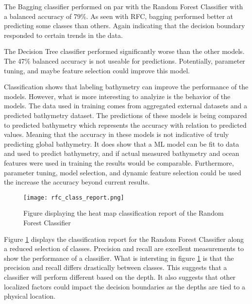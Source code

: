 \par
The Bagging classifier performed on par with the Random Forest Classifier with a balanced accuracy of 79\%.
As seen with \ac{RFC}, bagging performed better at predicting some classes than others.
Again indicating that the decision boundary responded to certain trends in the data.

\par
The Decision Tree classifier performed significantly worse than the other models.
The 47\% balanced accuracy is not useable for predictions.
Potentially, parameter tuning, and maybe feature selection could improve this model.

\par
Classification shows that labeling bathymetry can improve the performance of the models.
However, what is more interesting to analyize is the behavior of the models.
The data used in training comes from aggregated external datasets and a predicted bathymetry dataset.
The predictions of these models is being compared to predicted bathymetry which represents the accuracy with relation to predicted values.
Meaning that the accuracy in these models is not indicative of truly predicting global bathymetry.
It does show that a \ac{ML} model can be fit to data and used to predict bathymetry, and if actual measured bathymetry and ocean features were used in training the results would be comparable.
Furthermore, parameter tuning, model selection, and dynamic feature selection could be used the increase the accuracy beyond current results.

\begin{figure}[hb]
    \centering
    \texttt{[image: rfc\_class\_report.png]}
    \caption{Figure displaying the heat map classification report of the Random Forest Classifier}
    \label{fig:rfc_report}
\end{figure}

\par
Figure \ref{fig:rfc_report} displays the classification report for the Random Forest Classifier along a reduced selection of classes.
Precision and recall are excellent measurements to show the performance of a classifier.
What is intersting in figure \ref{fig:rfc_report} is that the precision and recall differs drastically between classes.
This suggests that a classifier will perform different based on the depth.
It also suggests that other localized factors could impact the decision boundaries as the depths are tied to a physical location.
